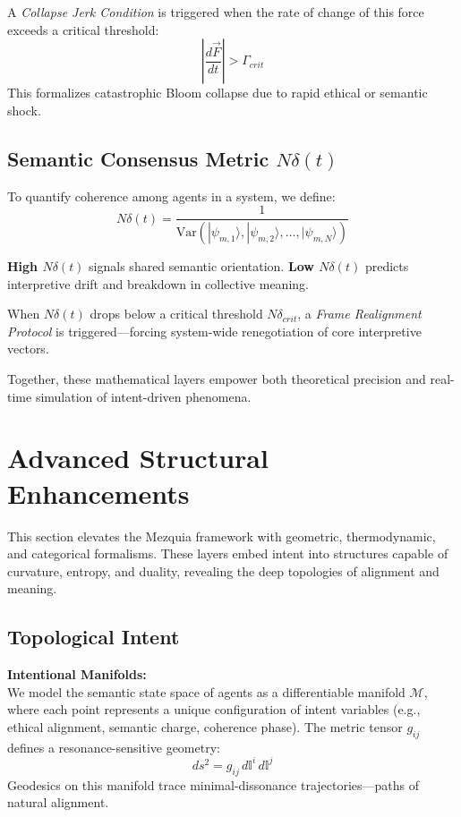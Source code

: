 \documentclass[12pt]{article}
\begin{document}
A \emph{Collapse Jerk Condition} is triggered when the rate of change of this force exceeds a critical threshold:
\[
\left| \frac{d\vec{F}}{dt} \right| > \Gamma_{crit}
\]
This formalizes catastrophic Bloom collapse due to rapid ethical or semantic shock.

\subsection{Semantic Consensus Metric \(N\delta(t)\)}

To quantify coherence among agents in a system, we define:
\[
N\delta(t) = \frac{1}{\text{Var}(|\psi_{m,1}\rangle, |\psi_{m,2}\rangle, \dots, |\psi_{m,N}\rangle)}
\]

\textbf{High \(N\delta(t)\)} signals shared semantic orientation. \textbf{Low \(N\delta(t)\)} predicts interpretive drift and breakdown in collective meaning.

When \(N\delta(t)\) drops below a critical threshold \(N\delta_{crit}\), a \emph{Frame Realignment Protocol} is triggered—forcing system-wide renegotiation of core interpretive vectors.

Together, these mathematical layers empower both theoretical precision and real-time simulation of intent-driven phenomena.

\section{Advanced Structural Enhancements}

This section elevates the Mezquia framework with geometric, thermodynamic, and categorical formalisms. These layers embed intent into structures capable of curvature, entropy, and duality, revealing the deep topologies of alignment and meaning.

\subsection{Topological Intent}

\textbf{Intentional Manifolds:} \\
We model the semantic state space of agents as a differentiable manifold \(\mathcal{M}\), where each point represents a unique configuration of intent variables (e.g., ethical alignment, semantic charge, coherence phase). The metric tensor \(g_{ij}\) defines a resonance-sensitive geometry:
\[
ds^2 = g_{ij} \, d\mathbb{I}^i \, d\mathbb{I}^j
\]
Geodesics on this manifold trace minimal-dissonance trajectories—paths of natural alignment.
\end{document}
